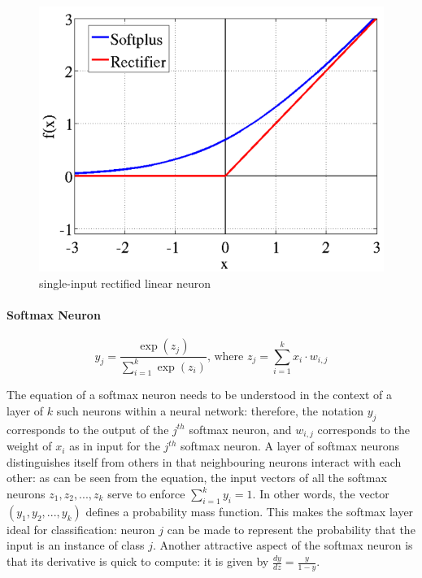\documentclass[a4paper,11pt]{article}
\begin{document}
\begin{figure}[h!]
	\centering
	\includegraphics[scale=0.3]{images/rectifier.png}
	\caption{single-input rectified linear neuron}
\end{figure}

\paragraph{Softmax Neuron}
\begin{equation}
\label{}
y_{j} = \frac{\exp(z_{j})}{\sum\limits_{i=1}^k\exp(z_{i})} \text{, where } z_{j} = \sum\limits_{i=1}^k x_{i}\cdot w_{i,j}
\end{equation}

The equation of a softmax neuron needs to be understood in the context of a layer of $k$ such neurons within a neural network: therefore, the notation $y_{j}$ corresponds to the output of the $j^{th}$ softmax neuron, and $w_{i,j}$ corresponds to the weight of $x_{i}$ as in input for the $j^{th}$ softmax neuron. A layer of softmax neurons distinguishes itself from others in that neighbouring neurons interact with each other: as can be seen from the equation, the input vectors of all the softmax neurons $z_{1}, z_{2}, ..., z_{k}$ serve to enforce $\sum\limits_{i=1}^k y_{i} = 1$. In other words, the vector $(y_{1}, y_{2}, ..., y_{k})$ defines a probability mass function. This makes the softmax layer ideal for classification: neuron $j$ can be made to represent the probability that the input is an instance of class $j$. Another attractive aspect of the softmax neuron is that its derivative is quick to compute: it is given by $\frac{dy}{dz} = \frac{y}{1-y}$.
\end{document}
